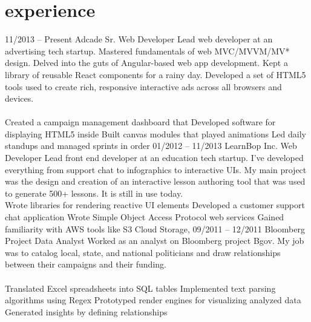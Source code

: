 \documentclass[]{friggeri-cv}
\begin{document}
\section{experience}
\tabentry
  {11/2013 – Present}
  {Adcade}
  {Sr. Web Developer}
  {Lead web developer at an advertising tech startup. Mastered fundamentals of web MVC/MVVM/MV* design. Delved into the guts of Angular-based web app development. Kept a library of reusable React components for a rainy day. Developed a set of HTML5 tools used to create rich, responsive interactive ads across all browsers and devices.\\%
  \\%
    \bulletlist
    {Created a campaign management dashboard that }
    {Developed software for displaying HTML5 inside }
    {Built canvas modules that played animations }
    {Led daily standups and managed sprints in order }
  }
\tabentry
  {01/2012 – 11/2013}
  {LearnBop Inc.}
  {Web Developer}
  {Lead front end developer at an education tech startup. I've developed everything from support chat to infographics to interactive UIs. My main project was the design and creation of an interactive lesson authoring tool that was used to generate 500+ lessons. It is still in use today.
  \\%
    \bulletlist
    {Wrote libraries for rendering reactive UI elements }
    {Developed a customer support chat application }
    {Wrote Simple Object Access Protocol web services }
    {Gained familiarity with AWS tools like S3 Cloud Storage, }
  }
\pagebreak
\tabentry
  {09/2011 – 12/2011}
  {Bloomberg}
  {Project Data Analyst}
  {Worked as an analyst on Bloomberg project Bgov. My job was to catalog local, state, and national politicians and draw relationships between their campaigns and their funding.\\%
  \\%
    \bulletlist
    {Translated Excel spreadsheets into SQL tables}
    {Implemented text parsing algorithms using Regex}
    {Prototyped render engines for visualizing analyzed data}
    {Generated insights by defining relationships }
  }
\end{document}
